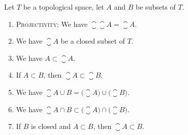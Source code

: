 \begin{theorem}
Let $T$ be a topological space, let $A$ and $B$ be subsets of $T$.
\begin{enumerate}
\item\textsc{Projectivity:} We have $\closure{\closure{A}}=\closure{A}$.
\item We have $\closure{A}$ be a closed subset of $T$.
\item{} We have $A\subset\closure{A}$.
\item{} If $A\subset B$, then $\closure{A}\subset\closure{B}$.
\item{} We have $\closure{A\cup B}=\bigl(\closure{A}\bigr)\cup\bigl(\closure{B}\bigr)$.
\item{} We have $\closure{A\cap B}\subset\bigl(\closure{A}\bigr)\cap\bigl(\closure{B}\bigr)$.
\item{} If $B$ is closed and $A\subset B$, then $\closure{A}\subset B$.
\end{enumerate}
\end{theorem}

